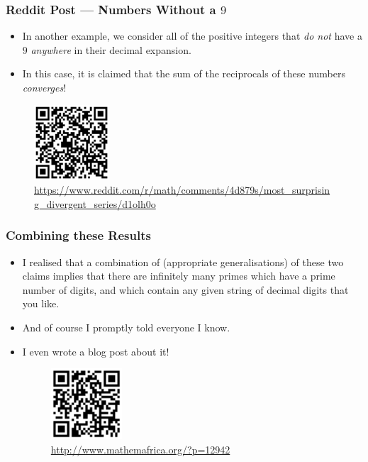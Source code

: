 \documentclass{beamer}
\begin{document}
\begin{frame}
    \frametitle{Reddit Post — Numbers Without a $9$}

    \begin{itemize}
        \item In another example, we consider all of the positive integers that \emph{do not} have a $9$ \emph{anywhere} in their decimal expansion. \pause
        \item In this case, it is claimed that the sum of the reciprocals of these numbers \emph{converges}!
    \end{itemize}

    \begin{figure}
        \centering
        \includegraphics[width=0.25\textwidth]{reddit_kempner.png}
        \caption{\url{https://www.reddit.com/r/math/comments/4d879s/most_surprising_divergent_series/d1olh0o}}
    \end{figure}

\end{frame}

\begin{frame}
    \frametitle{Combining these Results}

    \begin{itemize}
        \item I realised that a combination of (appropriate generalisations) of these two claims implies that there are infinitely many primes which have a prime number of digits, and which contain any given string of decimal digits that you like. \pause
        \item And of course I promptly told everyone I know. \pause
        \item I even wrote a blog post about it!
        \begin{figure}
            \centering
            \includegraphics[width=0.25\textwidth]{mathemafrica_link.png}
            \caption{\url{http://www.mathemafrica.org/?p=12942}}
        \end{figure}
    \end{itemize}

\end{frame}
\end{document}
